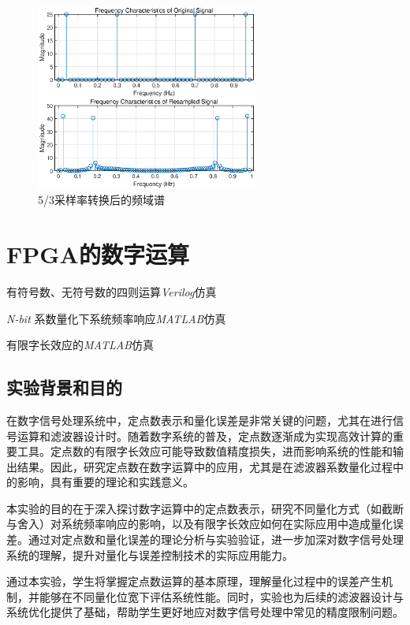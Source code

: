 \documentclass[lang=cn,newtx,10pt,scheme=chinese]{elegantbook}
\begin{document}
\begin{figure}[htbp]
  \centering
  \includegraphics[width=0.65\textwidth]{figure/exp1/fig6.eps}
  \caption{5/3采样率转换后的频域谱}
  \label{fig:fig6}
\end{figure}
\chapter{FPGA的数字运算}
\begin{introduction}
  \item 有符号数、无符号数的四则运算\textit{Verilog}仿真
  \item \textit{N-bit} 系数量化下系统频率响应\textit{MATLAB}仿真
  \item 有限字长效应的\textit{MATLAB}仿真
\end{introduction}
\section{实验背景和目的}

在数字信号处理系统中，定点数表示和量化误差是非常关键的问题，尤其在进行信号运算和滤波器设计时。随着数字系统的普及，定点数逐渐成为实现高效计算的重要工具。定点数的有限字长效应可能导致数值精度损失，进而影响系统的性能和输出结果。因此，研究定点数在数字运算中的应用，尤其是在滤波器系数量化过程中的影响，具有重要的理论和实践意义。

本实验的目的在于深入探讨数字运算中的定点数表示，研究不同量化方式（如截断与舍入）对系统频率响应的影响，以及有限字长效应如何在实际应用中造成量化误差。通过对定点数和量化误差的理论分析与实验验证，进一步加深对数字信号处理系统的理解，提升对量化与误差控制技术的实际应用能力。

通过本实验，学生将掌握定点数运算的基本原理，理解量化过程中的误差产生机制，并能够在不同量化位宽下评估系统性能。同时，实验也为后续的滤波器设计与系统优化提供了基础，帮助学生更好地应对数字信号处理中常见的精度限制问题。
\end{document}
